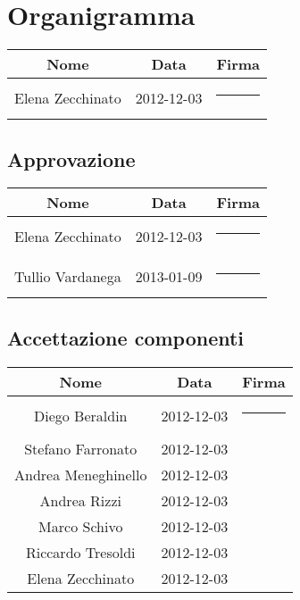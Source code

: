 \section{Organigramma}
\begin{center}
\begin{tabularx}{0.8\textwidth}{c|c|c}
{\bf Nome}&{\bf Data}&{\bf Firma}\\ 
\hline
\multirow{2}{*}{Elena Zecchinato} &\multirow{2}{*}{ 2012-12-03} &\rule{3cm}{0cm} \\&&\\
\end{tabularx}
\end{center}

\subsection{Approvazione}
\begin{center}
\begin{tabularx}{0.8\textwidth}{c|c|c}
{\bf Nome}&{\bf Data}&{\bf Firma}\\ 
\hline
\multirow{2}{*}{Elena Zecchinato} & \multirow{2}{*}{2012-12-03} &\rule{3cm}{0cm} \\&&\\
\multirow{2}{*}{Tullio Vardanega} & \multirow{2}{*}{2013-01-09} &\rule{3cm}{0cm} \\&&\\
\end{tabularx}
\end{center}

\subsection{Accettazione componenti}
\begin{center}
\begin{tabularx}{0.9\textwidth}{c|c|c}
{\bf Nome}&{\bf Data}&{\bf Firma }\\ 
\hline
\multirow{2}{*}{Diego Beraldin} & \multirow{2}{*}{2012-12-03}&\rule{3cm}{0cm}\\&&\\
\multirow{2}{*}{Stefano Farronato} &\multirow{2}{*}{2012-12-03}&\\&&\\
\multirow{2}{*}{Andrea Meneghinello} &\multirow{2}{*}{2012-12-03}&\\&&\\
\multirow{2}{*}{Andrea Rizzi} &\multirow{2}{*}{2012-12-03}&\\&&\\
\multirow{2}{*}{Marco Schivo} &\multirow{2}{*}{2012-12-03}&\\&&\\
\multirow{2}{*}{Riccardo Tresoldi} &\multirow{2}{*}{2012-12-03}&\\&&\\
\multirow{2}{*}{Elena Zecchinato}&\multirow{2}{*}{2012-12-03}&\\&&\\
\end{tabularx}
\end{center}

